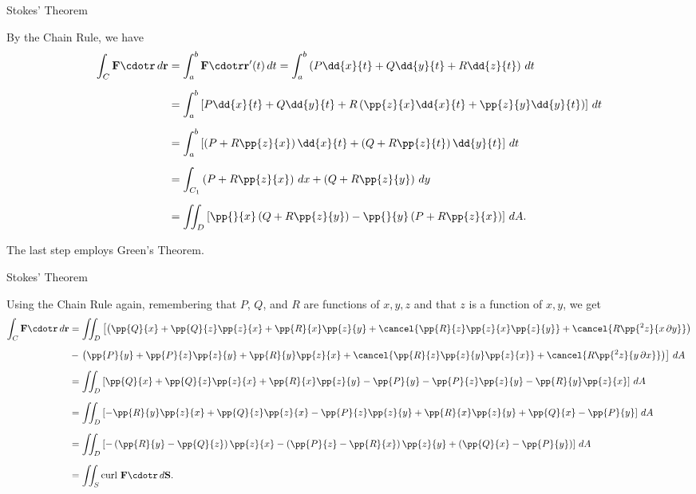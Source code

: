 \documentclass[11pt,english,
handout
]{beamer}
\begin{document}
\begin{frame}[t]{Stokes' Theorem}
\small
\begin{proofs}
By the Chain Rule, we have 
{\footnotesize
\begin{align*}
\int_C\mathbf{F}\cdotr\,d\mathbf{r}&=\int_a^b\mathbf{F}\cdotr\mathbf{r}'(t)\,dt=\int_a^b\left(P\dd{x}{t}+Q\dd{y}{t}+R\dd{z}{t}\right)\,dt\\[2mm]
&=\int_a^b\left[P\dd{x}{t}+Q\dd{y}{t}+R\left(\pp{z}{x}\dd{x}{t}+\pp{z}{y}\dd{y}{t}\right)\right]\,dt\\[2mm]
&=\int_a^b\left[\left(P+R\pp{z}{x}\right)\dd{x}{t}+\left(Q+R\pp{z}{t}\right)\dd{y}{t}\right]\,dt\\[2mm]
&=\int_{C_1}\left(P+R\pp{z}{x}\right)\,dx+\left(Q+R\pp{z}{y}\right)\,dy\\[2mm]
&=\iint_D\left[\pp{}{x}\left(Q+R\pp{z}{y}\right)-\pp{}{y}\left(P+R\pp{z}{x}\right)\right]\,dA.
\end{align*}}

The last step employs Green's Theorem.
\end{proofs}
\end{frame}










\begin{frame}[t]{Stokes' Theorem}
\small
\begin{proofs}
Using the Chain Rule again, remembering that $P$, $Q$, and $R$ are functions of $x,y,z$ and that $z$ is a function of $x,y$, we get
{\scriptsize
\begin{align*}
\int_C\mathbf{F}\cdotr\,d\mathbf{r}&=\iint_D\left[\left(\pp{Q}{x}+\pp{Q}{z}\pp{z}{x}+\pp{R}{x}\pp{z}{y}+\cancel{\pp{R}{z}\pp{z}{x}\pp{z}{y}}+\cancel{R\pp{^2z}{x\,\partial y}}\right)\right.\\[2mm]
&-\left.\left(\pp{P}{y}+\pp{P}{z}\pp{z}{y}+\pp{R}{y}\pp{z}{x}+\cancel{\pp{R}{z}\pp{z}{y}\pp{z}{x}}+\cancel{R\pp{^2z}{y\,\partial x}}\right)\right]\,dA\\[2mm]
&=\iint_D\left[\pp{Q}{x}+\pp{Q}{z}\pp{z}{x}+\pp{R}{x}\pp{z}{y}-\pp{P}{y}-\pp{P}{z}\pp{z}{y}-\pp{R}{y}\pp{z}{x}\right]\,dA\\[2mm]
&=\iint_D\left[-\pp{R}{y}\pp{z}{x}+\pp{Q}{z}\pp{z}{x}-\pp{P}{z}\pp{z}{y}+\pp{R}{x}\pp{z}{y}+\pp{Q}{x}-\pp{P}{y}\right]\,dA\\[2mm]
&=\iint_D\left[-\left(\pp{R}{y}-\pp{Q}{z}\right)\pp{z}{x}-\left(\pp{P}{z}-\pp{R}{x}\right)\pp{z}{y}+\left(\pp{Q}{x}-\pp{P}{y}\right)\right]\,dA\\[2mm]
&=\iint_S\text{curl }\mathbf{F}\cdotr\,d\mathbf{S}.
\end{align*}}
\end{proofs}
\end{frame}
\end{document}
